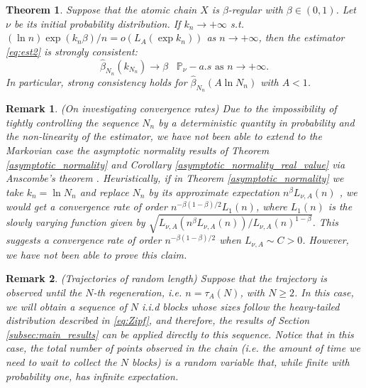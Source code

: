 \documentclass[sn-mathphys-ay]{sn-jnl}%
\newtheorem{theorem}{Theorem}[section]%
\newtheorem{remark}{Remark}%
\begin{document}
\begin{theorem}\label{th:consistency_markov} Suppose that the atomic chain $X$ is $\beta$-regular
    with $\beta\in (0,1)$. Let $\nu$ be its initial probability distribution. If
    \(k_n\to +\infty\) s.t. $(\ln n)\exp(k_n\beta)/n=o(L_A(\exp k_n))$ as
    $n\rightarrow +\infty$, then
    the estimator \eqref{eq:est2} is strongly consistent:
    \begin{equation}
        \widehat{\beta}_{N_n}(k_{N_n})\to \beta \;\;\; \mathbb{P}_{\nu}-a.s \text{ as } n\to +\infty.
    \end{equation}
    In particular, strong consistency holds for $\widehat{\beta}_{N_n}(A\ln N_n)$ with \(A<1\).
\end{theorem}

\begin{remark}\label{remark:convergence_rates} {\sc (On investigating convergence rates)} Due to the impossibility of tightly
    controlling the sequence $N_n$ by a deterministic quantity in probability and the non-linearity of
    the estimator, we have not been able to extend to the Markovian case the asymptotic normality results
    of Theorem \ref{asymptotic_normality} and Corollary
    \ref{asymptotic_normality_real_value} via Anscombe's theorem \cite[Theorem 7.3.2]{Gut2013}.
    Heuristically, if in Theorem \ref{asymptotic_normality} we take
    $k_n=\ln N_n$ and replace $N_n$ by
    its approximate expectation $n^{\beta}L_{\nu, A}(n)$ \cite[Lemma 3.3]{Tjostheim-2001},
    we would get a convergence rate of order $n^{-\beta\left(1-\beta\right)/2}L_1\left(n\right)$, where
    $L_1\left(n\right)$ is the slowly varying function given by
    $\sqrt{L_{\nu, A}(n^\beta L_{\nu, A}(n))/L_{\nu, A}(n)^{1-\beta}}$.
    This suggests a convergence rate of order $n^{-\beta(1-\beta)/2}$ when $L_{\nu, A}\sim C>0$. However,
    we have not been able to prove this claim.
\end{remark}

\begin{remark} {\sc (Trajectories of random length)} Suppose that the trajectory is observed until
    the $N$-th regeneration, \textit{i.e.} $n=\tau_A(N)$, with $N\geq 2$. In this case, we will obtain a
    sequence of $N$ i.i.d blocks whose sizes follow the heavy-tailed distribution described in
    \eqref{eq:Zipf}, and therefore, the results of Section \ref{subsec:main_results} can be applied directly
    to this sequence. Notice that in this case, the total number of points observed in the chain
    (i.e. the amount of time we need to wait to collect the $N$ blocks) is a random variable that, while
    finite with probability one, has infinite expectation.
\end{remark}
\end{document}

